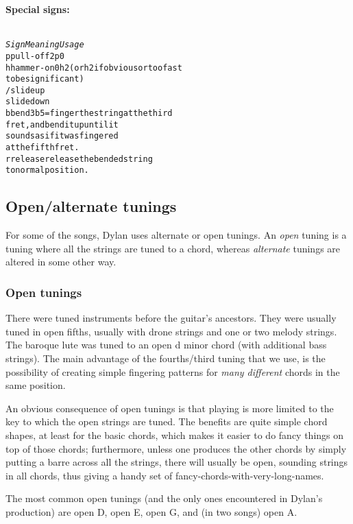 \noindent\textbf{Special signs:}
\begin{alltt}
{\small
\textsl{Sign  Meaning     Usage}
p     pull-off    2p0
h     hammer-on   0h2 (or h2 if obvious or too fast
                       to be significant)
/     slide up
\bs     slide down
b     bend        3b5 = finger the string at the third
                        fret, and bend it up until it
                        sounds as if it was fingered
                        at the fifth fret.
r     release     release the bended string
                  to normal position.}
\end{alltt}

\subsection*{Open/alternate tunings}

For some of the songs, Dylan uses alternate or open tunings. An \emph{open}
tuning is a tuning where all the strings are tuned to a chord, whereas
\emph{alternate} tunings are altered in some other way.

\subsubsection*{Open tunings}

There were tuned instruments before the guitar's ancestors. They were
usually tuned in open fifths, usually with drone strings and one or
two melody strings. The baroque lute was tuned to an open d minor
chord (with additional bass strings). The main advantage of the
fourths/third tuning that we use, is the possibility of creating
simple fingering patterns for \emph{many different} chords in the same
position.

An obvious consequence of open tunings is that playing is more limited
to the key to which the open strings are tuned. The benefits are quite
simple chord shapes, at least for the basic chords, which makes it
easier to do fancy things on top of those chords; furthermore, unless
one produces the other chords by simply putting a barre across all the
strings, there will usually be open, sounding strings in all chords,
thus giving a handy set of fancy-chords-with-very-long-names.

The most common open tunings (and the only ones encountered in Dylan's
production) are open D, open E, open G, and (in two songs) open A.

